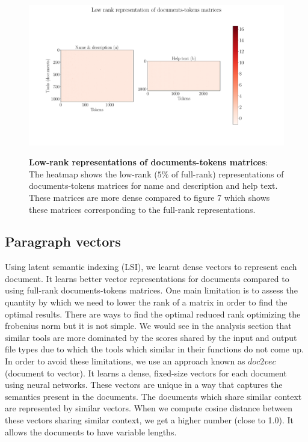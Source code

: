 \begin{figure}[h]
\begin{centering}
    {\includegraphics[scale=0.35]{figures/Document_tokens_low_rank.pdf}}
    \caption[Low-rank representations of documents-tokens matrices]{\textbf{Low-rank representations of documents-tokens matrices}: The heatmap shows the low-rank ($5\%$ of full-rank) representations of documents-tokens matrices for name and description and help text. These matrices are more dense compared to figure 7 which shows these matrices corresponding to the full-rank representations.}
\end{centering}
\end{figure}

\subsection{Paragraph vectors}
Using latent semantic indexing (LSI), we learnt dense vectors to represent each document. It learns better vector representations for documents compared to using full-rank documents-tokens matrices. One main limitation is to assess the quantity by which we need to lower the rank of a matrix in order to find the optimal results. There are ways to find the optimal reduced rank optimizing the frobenius norm but it is not simple. We would see in the analysis section that similar tools are more dominated by the scores shared by the input and output file types due to which the tools which similar in their functions do not come up. In order to avoid these limitations, we use an approach known as $doc2vec$ (document to vector). It learns a dense, fixed-size vectors for each document using neural networks. These vectors are unique in a way that captures the semantics present in the documents. The documents which share similar context are represented by similar vectors. When we compute cosine distance between these vectors sharing similar context, we get a higher number (close to 1.0). It allows the documents to have variable lengths.


